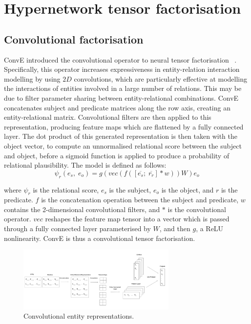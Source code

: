 \section{Hypernetwork tensor factorisation}

\subsection{Convolutional factorisation}

ConvE introduced the convolutional operator to neural tensor factorisation \unskip ~\citep{dettmers2018convolutional}. Specifically, this operator increases expressiveness in entity-relation interaction modelling by using $ 2D $ convolutions, which are particularly effective at modelling the interactions of entities involved in a large number of relations. This may be due to filter parameter sharing between entity-relational combinations. ConvE concatenates subject and predicate matrices along the row axis, creating an entity-relational matrix. Convolutional filters are then applied to this representation, producing feature maps which are flattened by a fully connected layer. The dot product of this generated representation is then taken with the object vector, to compute an unnormalised relational score between the subject and object, before a sigmoid function is applied to produce a probability of relational plausibility. The model is defined as follows:
\begin{equation}
	\psi_r(e_s, \; e_o) = g(vec(f(\left [ \overline{e_s}; \; \overline{r_r} \right ]*w))W)e_o
\end{equation}

\noindent where $ \psi_r $ is the relational score, $ e_s $ is the subject, $ e_o $ is the object, and $ r $ is the predicate. $ f $ is the concatenation operation between the subject and predicate, $ w $ contains the 2-dimensional convolutional filters, and $ * $ is the convolutional operator. $ vec $ reshapes the feature map tensor into a vector which is passed through a fully connected layer parameterised by $ W $, and then $ g $, a ReLU nonlinearity. ConvE is thus a convolutional tensor factorisation. 

\begin{figure}[H]
   	\centering
    	\includegraphics[width=0.7\textwidth, height=0.4\textwidth]{convolutional_entity_representations_final}
	\caption{Convolutional entity representations.}
\end{figure}

